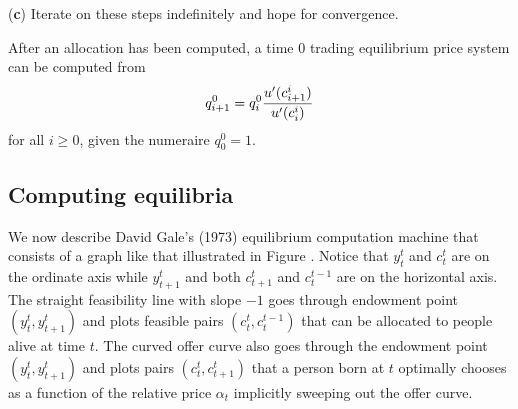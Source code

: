 \medskip
\item {({\bf c})} Iterate on these steps indefinitely and hope for convergence.




\medskip

\noindent After an allocation has been computed, a time $0$ 
trading equilibrium price system can be computed from
$$ q^0_{i+1} = q^0_i {u'(c^i_{i+1}) \over u'(c^i_i) } $$
for all $i \geq 0$, given the numeraire $q^0_0 =1$.






\subsection{Computing equilibria}\label{sec:olg_time0log}%
We now describe David Gale's (1973) equilibrium computation machine that consists of a graph like that
 illustrated
in Figure .
Notice that  $y_t^t$ and  $c_t^t$  are on the ordinate axis while
$y_{t+1}^t$ and both $c_{t+1}^t$ and $c_{t}^{t-1}$ are on the horizontal axis.
The straight  feasibility line with slope $-1$ goes through endowment point $(y_t^t, y^t_{t+1})$ and plots feasible
pairs   $(c_t^t, c_t^{t-1})$ that can be allocated to people alive at time $t$.  The curved offer curve also goes through the endowment point $(y_t^t, y^t_{t+1})$
and plots pairs $(c_t^t, c^t_{t+1})$ that a person born at $t$ optimally chooses as a function of the relative price $\alpha_t$ implicitly
sweeping out the offer curve.   


